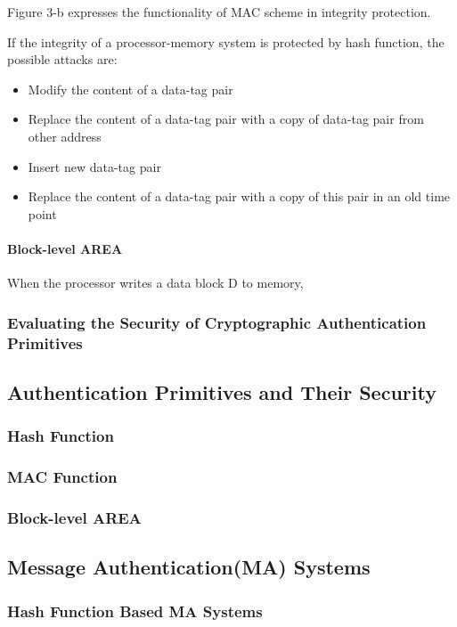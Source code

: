 \documentclass{article}
\begin{document}
Figure 3-b expresses the functionality of MAC scheme in integrity protection.

If the integrity of a processor-memory system is protected by hash function, the possible attacks are:
\begin{itemize}
	\item Modify the content of a data-tag pair
	\item Replace the content of a data-tag pair with a copy of data-tag pair from other address
	\item Insert new data-tag pair
	\item Replace the content of a data-tag pair with a copy of this pair in an old time point
\end{itemize}

\paragraph{Block-level AREA}
When the processor writes a data block D to memory, 

\subsubsection{Evaluating the Security of Cryptographic Authentication Primitives}

\subsection{Authentication Primitives and Their Security}
\subsubsection{Hash Function}
\subsubsection{MAC Function}
\subsubsection{Block-level AREA}

\subsection{Message Authentication(MA) Systems}
\subsubsection{Hash Function Based MA Systems}
\end{document}
